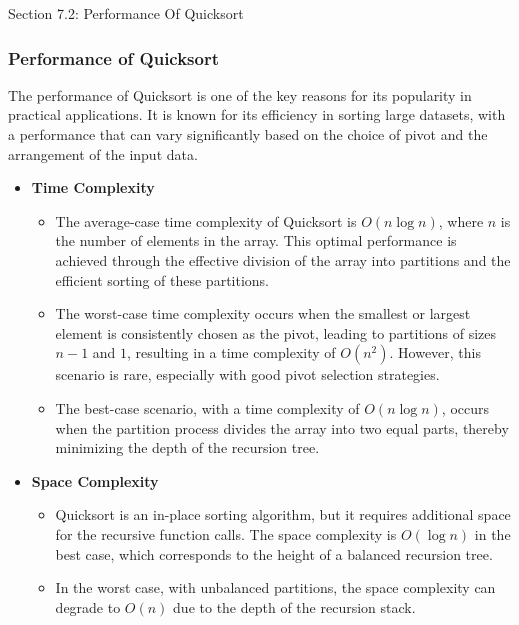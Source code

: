 \begin{notes}{Section 7.2: Performance Of Quicksort}
    \subsubsection*{Performance of Quicksort}

    The performance of Quicksort is one of the key reasons for its popularity in practical applications. It is known for its efficiency in sorting large datasets, with a performance that can vary 
    significantly based on the choice of pivot and the arrangement of the input data.
    
    \begin{itemize}
        \item \textbf{Time Complexity}
        \begin{itemize}
            \item The average-case time complexity of Quicksort is $O(n \log n)$, where $n$ is the number of elements in the array. This optimal performance is achieved through the effective division 
            of the array into partitions and the efficient sorting of these partitions.
            \item The worst-case time complexity occurs when the smallest or largest element is consistently chosen as the pivot, leading to partitions of sizes $n-1$ and $1$, resulting in a time 
            complexity of $O(n^2)$. However, this scenario is rare, especially with good pivot selection strategies.
            \item The best-case scenario, with a time complexity of $O(n \log n)$, occurs when the partition process divides the array into two equal parts, thereby minimizing the depth of the recursion 
            tree.
        \end{itemize}
        
        \item \textbf{Space Complexity}
        \begin{itemize}
            \item Quicksort is an in-place sorting algorithm, but it requires additional space for the recursive function calls. The space complexity is $O(\log n)$ in the best case, which corresponds 
            to the height of a balanced recursion tree.
            \item In the worst case, with unbalanced partitions, the space complexity can degrade to $O(n)$ due to the depth of the recursion stack.
        \end{itemize}
        

\end{itemize}
\end{notes}
